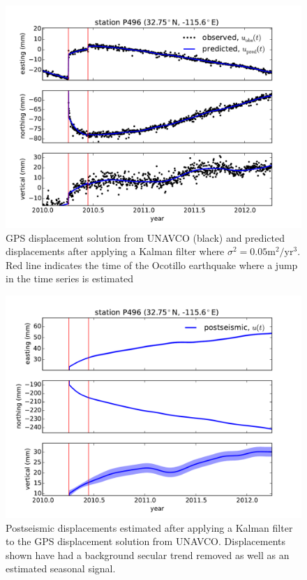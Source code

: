 \documentclass[12pt]{article}
\begin{document}
\begin{figure}
\includegraphics[scale=0.6]{Figures/figure_1}
\centering
\caption{GPS displacement solution from UNAVCO (black) and predicted displacements after applying a Kalman filter where $\sigma^2=0.05 \mathrm{m}^2/\mathrm{yr}^3$. Red line indicates the time of the Ocotillo earthquake where a jump in the time series is estimated}
\label{P496Fit}
\end{figure}

\begin{figure}
\includegraphics[scale=0.6]{Figures/figure_2}
\centering
\caption{Postseismic displacements estimated after applying a Kalman filter to the GPS displacement solution from UNAVCO.  Displacements shown have had a background secular trend removed as well as an estimated seasonal signal.} 
\label{P496PS}
\end{figure}
\end{document}
